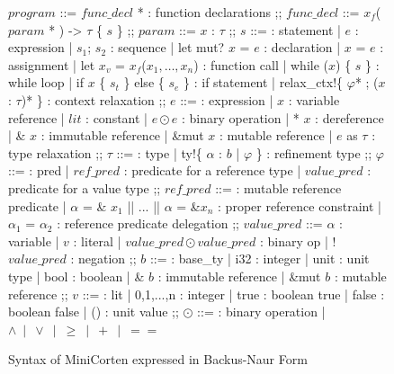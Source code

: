 \documentclass[twoside, english, final]{sdqthesis}
\newcommand{\ccolon}[0]{: }
\newcommand{\cmid}[0]{| }
\newcommand{\cdisj}[0]{|| }
\theoremstyle{definition}
\begin{document}
\begin{figure}[h]
  \centering
\begin{bnfgrammar}
  $program$  ::=
    $func\_decl$ * : function declarations
  ;;
  $func\_decl$ ::=
    $x_f$( $param$ * ) -> $\tau$ \{ $s$ \}
  ;;
  $param$ ::= $x$ \ccolon  $\tau$
  ;;
  $s$
  ::=                                                     : statement
    | $e$                                                 : expression
    | $s_1$; $s_2$                                        : sequence
    | let mut? $x$ = $e$                                  : declaration
    | $x$ = $e$                                           : assignment
    | let $x_v$ = $x_f$($x_1, \dots, x_n$)                : function call
    | while ($x$) \{ $s$ \}                               : while loop
    | if $x$ \{ $s_t$ \} else \{ $s_e$ \}               : if statement
    | relax\_ctx!\{ $\varphi$* ; ($x$ \ccolon $\tau$)* \} : context relaxation
  ;;
  $e$
  ::=                                                     : expression 
    | $x$                                                 : variable reference
    | $lit$                                               : constant
    | $e \odot e$                                         : binary operation
    | * $x$                                               : dereference
  | \& $x$                                                : immutable reference
  | \&mut $x$                                             : mutable reference
    | $e$ as $\tau$                                       : type relaxation
  ;;
  $\tau$
  ::=                                                     : type 
  | ty!\{ $\alpha$ \ccolon $b$ \cmid $\varphi$ \}         : refinement type
  ;;
  $\varphi$
    ::=                                                   : pred 
    | $ref\_pred$                                         : predicate for a reference type
    | $value\_pred$                                       : predicate for a value type
  ;;
  $ref\_pred$ ::=                                                   : mutable reference predicate
    | $\alpha$ = \& $x_1$ \cdisj ... \cdisj $\alpha$ = \&$x_n$  : proper reference constraint
    | $\alpha_1$ = $\alpha_2$                                       : reference predicate delegation
  ;;
  $value\_pred$ ::=
    $\alpha$                                 : variable
  | $v$                                      : literal
  | $value\_pred \odot value\_pred$          : binary op
  | ! $value\_pred$                          : negation
  ;;
  $b$
    ::=                     : base\_ty
    | i32                   : integer
    | unit                  : unit type
    | bool                  : boolean
    | \& $b$                : immutable reference
    | \&mut $b$             : mutable reference
  ;;
  $v$
    ::=                     : lit 
    | 0,1,...,n             : integer
    | true                  : boolean true
    | false                 : boolean false
    | ()                    : unit value
  ;;
  $\odot$
    ::=                     : binary operation
    | $\wedge \ \mid \ \vee \ \mid \ \geq \ \mid \ + \ \mid \ ==$
\end{bnfgrammar}
\caption{Syntax of MiniCorten expressed in Backus-Naur Form}
	\label{fig:mini-corten-syntax}
\end{figure}
\end{document}
